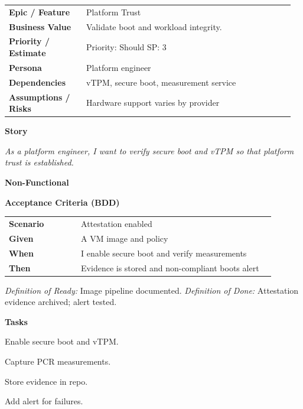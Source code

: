\documentclass[11pt,letterpaper]{article}
\makeatletter
\newenvironment{kvtable}{%
  \par\noindent\begin{tabular}{@{}>{\raggedright\bfseries\arraybackslash}p{0.26\linewidth} >{\raggedright\arraybackslash}p{0.70\linewidth}@{}}
}{\end{tabular}\par}
\newenvironment{bdd}{%
  \par\noindent\begin{tabular}{@{}>{\raggedright\bfseries\arraybackslash}p{0.26\linewidth} >{\raggedright\arraybackslash}p{0.70\linewidth}@{}}
}{\end{tabular}\par}
\newcommand{\DoRDoD}[2]{%
  \vspace{0.35em}
  {\footnotesize\color{Muted}%
    \textit{Definition of Ready:} #1 \; \textbullet\;
    \textit{Definition of Done:} #2%
  }%
}
\newenvironment{storycard}[2]{%
  \begin{tcolorbox}[cloudcard, title={#1 --- #2}]%
}{\end{tcolorbox}}
\newcommand{\sectionlabel}[1]{\par\vspace{0.35em}\textbf{#1}\par}
\makeatother
\begin{document}
\begin{storycard}{CCS-24}{Ch. 24 — Trusted Computing Technology}
\begin{kvtable}
Epic / Feature & Platform Trust\\
Business Value & Validate boot and workload integrity.\\
Priority / Estimate & Priority: Should \quad SP: 3\\
Persona & Platform engineer\\
Dependencies & vTPM, secure boot, measurement service\\
Assumptions / Risks & Hardware support varies by provider\\
\end{kvtable}
\sectionlabel{Story}
\textit{As a platform engineer, I want to verify secure boot and vTPM so that platform trust is established.}
\sectionlabel{Non-Functional}\;
\sectionlabel{Acceptance Criteria (BDD)}
\begin{bdd}
Scenario & Attestation enabled\\
Given & A VM image and policy\\
When & I enable secure boot and verify measurements\\
Then & Evidence is stored and non-compliant boots alert\\
\end{bdd}
\DoRDoD{Image pipeline documented.}{Attestation evidence archived; alert tested.}
\sectionlabel{Tasks}
\begin{checklist}
\item Enable secure boot and vTPM.
\item Capture PCR measurements.
\item Store evidence in repo.
\item Add alert for failures.
\end{checklist}
\end{storycard}
\end{document}
